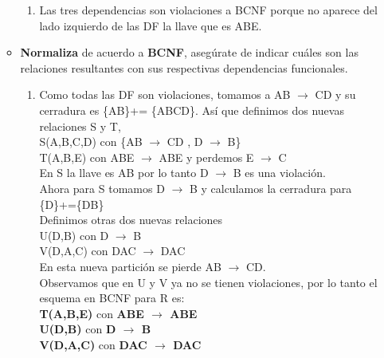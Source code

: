 \documentclass{article}
\begin{document}
\begin{enumerate}
\begin{itemize}
\begin{enumerate}
		\item Las tres dependencias son violaciones a BCNF porque no aparece del lado izquierdo de las DF la llave que es ABE.
	\end{enumerate}
	\item \textbf{Normaliza} de acuerdo a \textbf{BCNF}, asegúrate de indicar cuáles son las relaciones resultantes con sus respectivas dependencias funcionales.
	\begin{enumerate}
		\item Como todas las DF son violaciones, tomamos a AB $\rightarrow$ CD y su cerradura es  \{AB\}+= \{ABCD\}.
		Así que definimos dos nuevas relaciones S y T,\\
		S(A,B,C,D) con \{AB $\rightarrow$ CD , D $\rightarrow$ B\}\\
		T(A,B,E) con ABE $\rightarrow$ ABE y perdemos E $\rightarrow$ C\\
		En S la llave es AB por lo tanto D $\rightarrow$ B es una violación.\\
		Ahora para S tomamos D $\rightarrow$ B y calculamos la cerradura para \{D\}+=\{DB\}\\
		Definimos otras dos nuevas relaciones\\
		U(D,B) con D $\rightarrow$ B\\
		V(D,A,C) con DAC $\rightarrow$ DAC\\
		En esta nueva partición se pierde AB $\rightarrow$ CD.\\
		Observamos que en U y V ya no se tienen violaciones, por lo tanto el esquema en BCNF para R es:\\
		\textbf{T(A,B,E)} con \textbf{ABE $\rightarrow$ ABE}\\
		\textbf{U(D,B)} con \textbf{D $\rightarrow$ B}\\
		\textbf{V(D,A,C)} con \textbf{DAC $\rightarrow$ DAC}\\
		

\end{enumerate}
\end{itemize}
\end{enumerate}
\end{document}
